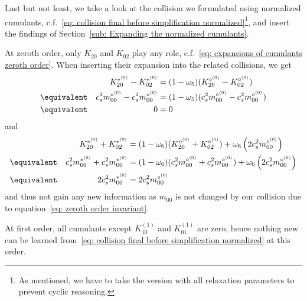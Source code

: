 Last but not least, we take a look at the collision we formulated using normalized cumulants, c.f.~\eqref{eq: collision final before simplification normalized}\footnote{As mentioned, we have to take the version with all relaxation parameters to prevent cyclic reasoning.},
and insert the findings of Section~\ref{sub: Expanding the normalized cumulants}.

At zeroth order, only $K_{20}$ and $K_{02}$ play any role, c.f.~\eqref{eq: expansions of cumulants zeroth order}.
When inserting their expansion into the related collisions, we get
\begin{equation*}
  \begin{aligned}
    &&
    K_{20}^{*^{(0)}} - K_{02}^{*^{(0)}}
      & = (1-\omega_5) (K_{20}^{\circ^{(0)}} - K_{02}^{\circ^{(0)}})
      \\ &\equivalent&
    c_s^2 m_{00}^{*^{(0)}} - c_s^2 m_{00}^{*^{(0)}}
        & = (1-\omega_5) (c_s^2 m_{00}^{\circ^{(0)}} - c_s^2 m_{00}^{\circ^{(0)}})
      \\ &\equivalent&
    0 & = 0
  \end{aligned}
\end{equation*}
and
\begin{equation*}
  \begin{aligned}
    &&K_{20}^{*^{(0)}} + K_{02}^{*^{(0)}}
      & = (1-\omega_6)(K_{20}^{\circ^{(0)}} + K_{02}^{\circ^{(0)}}) + \omega_6 \left( 2 c_s^2 m_{00}^{\circ^{(0)}} \right)
      \\ &\equivalent&
    c_s^2 m_{00}^{*^{(0)}} + c_s^2 m_{00}^{*^{(0)}}
      & = (1-\omega_6)(c_s^2 m_{00}^{\circ^{(0)}} + c_s^2 m_{00}^{\circ^{(0)}}) + \omega_6 \left( 2 c_s^2 m_{00}^{\circ^{(0)}} \right)
      \\ &\equivalent&
    2c_s^2 m_{00}^{*^{(0)}}
      & = 2 c_s^2 m_{00}^{\circ^{(0)}}
  \end{aligned}
\end{equation*}
and thus not gain any new information as $m_{00}$ is not changed by our collision due to equation~\eqref{eq: zeroth order invariant}.

At first order, all cumulants except $K_{10}^{(1)}$ and $K_{01}^{(1)}$ are zero, hence nothing new can be learned from~\eqref{eq: collision final before simplification normalized} at this order.

